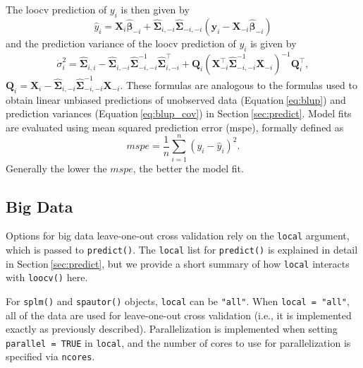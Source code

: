 \documentclass{article}
\begin{document}
The loocv prediction of \(y_i\) is then given by \begin{equation*}
  \hat{y}_i = \mathbf{X}_i \hat{\boldsymbol{\beta}}_{-i} + \hat{\boldsymbol{\Sigma}}_{i, -i}\hat{\boldsymbol{\Sigma}}_{-i, -i}(\mathbf{y}_i - \mathbf{X}_{-i} \hat{\boldsymbol{\beta}}_{-i})
\end{equation*} and the prediction variance of the loocv prediction of
\(y_i\) is given by \begin{equation*}
  \dot{\sigma}^2_i = \hat{\boldsymbol{\Sigma}}_{i, i} - \hat{\boldsymbol{\Sigma}}_{i, - i} \hat{\boldsymbol{\Sigma}}^{-1}_{-i, -i} \hat{\boldsymbol{\Sigma}}_{i, - i}^\top + \mathbf{Q}_i(\mathbf{X}_{-i}^\top \hat{\boldsymbol{\Sigma}}_{-i, -i}^{-1} \mathbf{X}_{-i})^{-1}\mathbf{Q}_i^\top ,
\end{equation*}
\(\mathbf{Q}_i = \mathbf{X}_i - \hat{\boldsymbol{\Sigma}}_{i, -i} \hat{\boldsymbol{\Sigma}}^{-1}_{-i, -i} \mathbf{X}_{-i}\).
These formulas are analogous to the formulas used to obtain linear
unbiased predictions of unobserved data (Equation\(~\)\ref{eq:blup}) and
prediction variances (Equation\(~\)\ref{eq:blup_cov}) in
Section\(~\)\ref{sec:predict}. Model fits are evaluated using mean
squared prediction error (mspe), formally defined as \begin{equation*}
 mspe = \frac{1}{n}\sum_{i = 1}^n(y_i - \hat{y}_i)^2.
\end{equation*} Generally the lower the \(mspe\), the better the model
fit.

\hypertarget{big-data}{%
\subsection{Big Data}\label{big-data}}

Options for big data leave-one-out cross validation rely on the
\texttt{local} argument, which is passed to \texttt{predict()}. The
\texttt{local} list for \texttt{predict()} is explained in detail in
Section\(~\)\ref{sec:predict}, but we provide a short summary of how
\texttt{local} interacts with \texttt{loocv()} here.

For \texttt{splm()} and \texttt{spautor()} objects, \texttt{local} can
be \texttt{"all"}. When \texttt{local\ =\ "all"}, all of the data are
used for leave-one-out cross validation (i.e., it is implemented exactly
as previously described). Parallelization is implemented when setting
\texttt{parallel\ =\ TRUE} in \texttt{local}, and the number of cores to
use for parallelization is specified via \texttt{ncores}.
\end{document}
